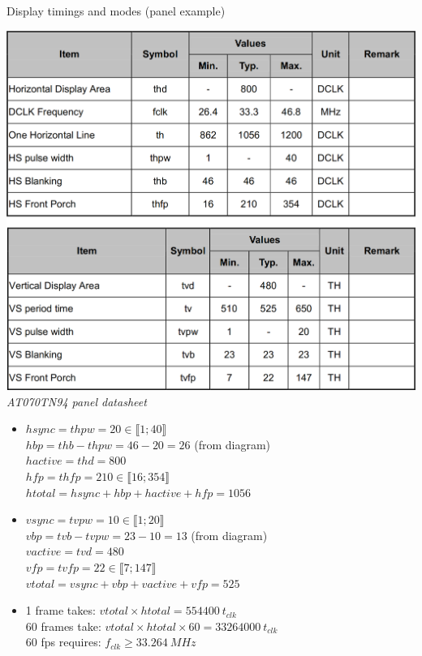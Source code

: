 \begin{frame}{Display timings and modes (panel example)}

  \begin{minipage}[b]{0.35\textwidth}
    \centering
    \vspace{2em}
    \includegraphics[width=\textwidth]{slides/graphics-hardware/timings-table.png}
    \textit{\small AT070TN94 panel datasheet}
    \vfill~
  \end{minipage}
  \hfill
  \begin{minipage}[b]{0.6\textwidth}
    \small
    \begin{itemize}
    \item \(hsync = thpw = 20 \in \llbracket 1;40 \rrbracket\)\\
    \(hbp = thb - thpw = 46 - 20 = 26\) (from diagram)\\
    \(hactive = thd = 800\)\\
    \(hfp = thfp = 210 \in \llbracket 16;354 \rrbracket\)\\
    \(htotal = hsync + hbp + hactive + hfp = 1056\)

    \item \(vsync = tvpw = 10 \in \llbracket 1;20 \rrbracket\)\\
    \(vbp = tvb - tvpw = 23 - 10 = 13\) (from diagram)\\
    \(vactive = tvd = 480\)\\
    \(vfp = tvfp = 22 \in \llbracket 7;147 \rrbracket\)\\
    \(vtotal = vsync + vbp + vactive + vfp = 525\)
    \item 1 frame takes: \(vtotal \times htotal = 554400~t_{clk}\)\\
    60 frames take: \(vtotal \times htotal \times 60 = 33264000~t_{clk}\)\\
    60 fps requires: \(f_{clk} \geq 33.264~MHz\)
    \end{itemize}
  \end{minipage}
  \vspace{0.5em}


\end{frame}
